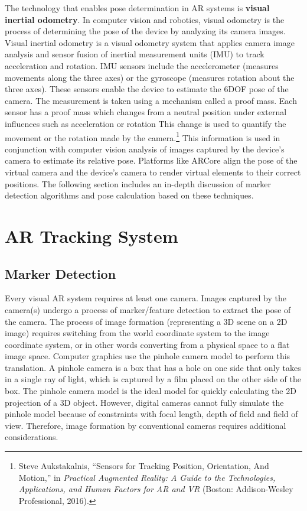 The technology that enables pose determination in AR systems is \textbf{visual inertial odometry}. In computer vision and robotics, visual odometry is the process of determining the pose of the device by analyzing its camera images. Visual inertial odometry is a visual odometry system that applies camera image analysis and sensor fusion of inertial measurement units (IMU) to track acceleration and rotation. IMU sensors include the accelerometer (measures movements along the three axes) or the gyroscope (measures rotation about the three axes). These sensors enable the device to estimate the 6DOF pose of the camera. The measurement is taken using a mechanism called a proof mass. Each sensor has a proof mass which changes from a neutral position under external influences such as acceleration or rotation  This change is used to quantify the movement or the rotation made by the camera.\footnote{Steve Aukstakalnis, “Sensors for Tracking Position, Orientation, And Motion,” in \textit{Practical Augmented Reality: A Guide to the Technologies, Applications, and Human Factors for AR and VR} (Boston: Addison-Wesley Professional, 2016).} This information is used in conjunction with computer vision analysis of images captured by the device’s camera to estimate its relative pose. Platforms like ARCore align the pose of the virtual camera and the device's camera to render virtual elements to their correct positions. The following section includes an in-depth discussion of marker detection algorithms and pose calculation based on these techniques.

\section{AR Tracking System}
\subsection{Marker Detection}
Every visual AR system requires at least one camera. Images captured by the camera(s) undergo a process of marker/feature detection to extract the pose of the camera. The process of image formation (representing a 3D scene on a 2D image) requires switching from the world coordinate system to the image coordinate system, or in other words converting from a physical space to a flat image space. Computer graphics use the pinhole camera model to perform this translation. A pinhole camera is a box that has a hole on one side that only takes in a single ray of light, which is captured by a film placed on the other side of the box. The pinhole camera model is the ideal model for quickly calculating the 2D projection of a 3D object. However, digital cameras cannot fully simulate the pinhole model because of constraints with focal length, depth of field and field of view. Therefore, image formation by conventional cameras requires additional considerations.

